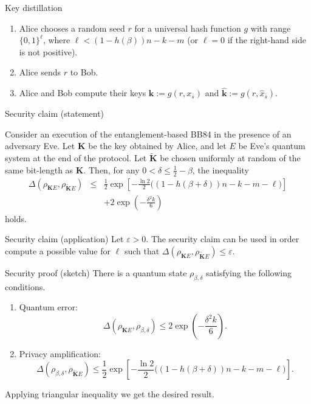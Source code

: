 \documentclass{beamer}
\begin{document}
\begin{frame}{Key distillation}
\begin{enumerate}[label=(\roman*)]
\item Alice chooses a random seed $r$ for a universal hash function $g$ with range $\{0,1\}^{\ell}$, where $\ell < \left(1 - h(\beta)\right) n - k - m$ (or $\ell = 0$ if the right-hand side is not positive).
\item Alice sends $r$ to Bob.
\item Alice and Bob compute their keys $\mathbf{k} := g(r, x_{\overline{s}})$ and $\mathbf{\hat{k}} := g(r, \hat{x}_{\overline{s}})$.
\end{enumerate}
\end{frame}

\begin{frame}{Security claim (statement)}

Consider an execution of the entanglement-based BB84 in the presence of an adversary Eve. Let $\mathbf{K}$ be the key obtained by Alice, and let $E$ be Eve's quantum system at the end of the protocol. Let $\mathbf{\tilde{K}}$ be chosen uniformly at random of the same bit-length as $\mathbf{K}$. Then, for any $0 < \delta \leq \frac{1}{2}-\beta$, the inequality
\begin{eqnarray*}
\Delta\left( \rho_{\mathbf{K}E}, \rho_{\mathbf{\tilde{K}}E} \right) &\leq& \frac{1}{2}  \exp\left[ -\frac{\ln 2}{2} \bigg( (1 - h(\beta+\delta))n - k - m - \ell \bigg) \right] \\
& & + 2\exp\left( -\frac{\delta^2 k}{6} \right)
\end{eqnarray*}
holds.

\end{frame}

\begin{frame}{Security claim (application)}
Let  $\varepsilon > 0$. The security claim can be used in order compute a possible value for $\ell$ such that $\Delta\left( \rho_{\mathbf{K}E}, \rho_{\mathbf{\tilde{K}}E} \right) \leq \varepsilon$.
\end{frame}

\begin{frame}{Security proof (sketch)}
There is a quantum state $\rho_{\beta,\delta}$ satisfying the following conditions.
\begin{enumerate}[label=(\roman*)]
\item Quantum error: $$\Delta\left( \rho_{\mathbf{K}E}, \rho_{\beta,\delta} \right) \leq 2\exp\left( -\frac{\delta^2 k}{6} \right).$$
\item Privacy amplification: $$\Delta\left(\rho_{\beta,\delta}, \rho_{\mathbf{\tilde{K}}E} \right) \leq \frac{1}{2} \exp\left[ -\frac{\ln 2}{2} \bigg( (1 - h(\beta+\delta))n - k - m - \ell \bigg) \right].$$
\end{enumerate}

Applying triangular inequality we get the desired result.
\end{frame}
\end{document}
